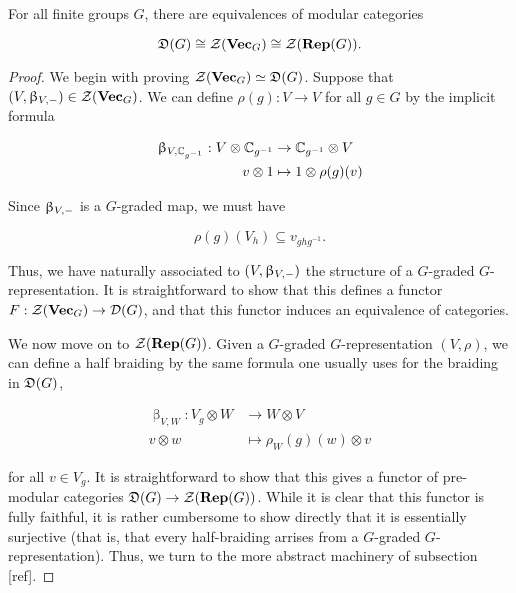 \begin{prop} For all finite groups $G$, there are equivalences of modular categories

$${\mathfrak D}(G)\cong {\mathcal Z}({\bf Vec}_G)\cong {\mathcal Z}({\bf Rep}(G)).$$
\end{prop}
\begin{proof} We begin with proving ${\mathcal Z}({\bf Vec}_G)\simeq {\mathfrak D}(G)$. Suppose that $(V,\upbeta_{V,-})\in {\mathcal Z}({\bf Vec}_G)$. We can define $\rho(g):V\to V$ for all $g\in G$ by the implicit formula

\begin{align*}
\upbeta_{V,{\mathbb C}_{g^{-1}}}:V\otimes {\mathbb C}_{g^{-1}}&\to {\mathbb C}_{g^{-1}}\otimes V\\
v\otimes 1 &\mapsto 1\otimes \rho(g)(v)
\end{align*}

Since $\upbeta_{V,-}$ is a $G$-graded map, we must have

$$\rho(g)(V_h)\subseteq v_{ghg^{-1}}.$$

Thus, we have naturally associated to $(V,\upbeta_{V,-})$ the structure of a $G$-graded $G$-representation. It is straightforward to show that this defines a functor $F:{\mathcal Z}({\bf Vec}_G)\to {\mathcal D}(G)$, and that this functor induces an equivalence of categories.

We now move on to ${\mathcal Z}({\bf Rep}(G))$. Given a $G$-graded $G$-representation $(V,\rho)$, we can define a half braiding by the same formula one usually uses for the braiding in ${\mathfrak D}(G)$,

\begin{align*}
\upbeta_{V,W}:V_g\otimes W&\to W\otimes V \\
v\otimes w&\mapsto \rho_W(g)(w)\otimes v
\end{align*}

for all $v\in V_g$. It is straightforward to show that this gives a functor of pre-modular categories ${\mathfrak D}(G)\to{\mathcal Z}({\bf Rep}(G))$. While it is clear that this functor is fully faithful, it is rather cumbersome to show directly that it is essentially surjective (that is, that every half-braiding arrises from a $G$-graded $G$-representation). Thus, we turn to the more abstract machinery of subsection [ref].

\end{proof}

